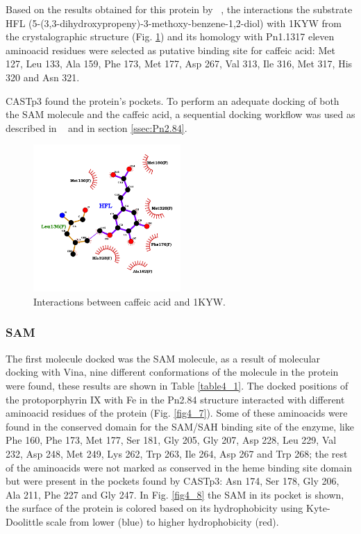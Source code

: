 \documentclass[12pt]{article}
\newcommand{\textcite}[1]{\citeauthor{#1}~\citeyear{#1}}
\begin{document}
	Based on the results obtained for this protein by \textcite{caff}, the interactions the substrate HFL (5-(3,3-dihydroxypropeny)-3-methoxy-benzene-1,2-diol) with 1KYW from the crystalographic structure (Fig. \ref{fig4_6}) and its homology with Pn1.1317 eleven aminoacid residues were selected as putative binding site for caffeic acid: Met 127, Leu 133, Ala 159, Phe 173, Met 177, Asp 267, Val 313, Ile 316, Met 317, His 320 and Asn 321.
	
	CASTp3 found the protein's pockets. \cite{castp} To perform an adequate docking of both the SAM molecule and the caffeic acid, a sequential docking workflow was used as described in \textcite{sequential} and in section \ref{ssec:Pn2.84}.
	
	\newpage
	
	\FloatBarrier
	\begin{figure}
		\centering
		\includegraphics[width=0.5\textwidth]{../4/Phylogeny/hfl.png}
		\caption{Interactions between caffeic acid and 1KYW.}
		\label{fig4_6}
	\end{figure}
	\FloatBarrier
	
	\subsubsection{SAM}
	
	The first molecule docked was the SAM molecule, as a result of molecular docking with Vina, nine different conformations of the molecule in the protein were found, these results are shown in Table \ref{table4_1}. The docked positions of the protoporphyrin IX with Fe in the Pn2.84 structure interacted with different aminoacid residues of the protein (Fig. \ref{fig4_7}). Some of these aminoacids were found in the conserved domain for the SAM/SAH binding site of the enzyme, like Phe 160, Phe 173, Met 177, Ser 181, Gly 205, Gly 207, Asp 228, Leu 229, Val 232, Asp 248, Met 249, Lys 262, Trp 263, Ile 264, Asp 267 and Trp 268; the rest of the aminoacids were not marked as conserved in the heme binding site domain but were present in the pockets found by CASTp3: Asn 174, Ser 178, Gly 206, Ala 211, Phe 227 and Gly 247. In Fig. \ref{fig4_8} the SAM in its pocket is shown, the surface of the protein is colored based on its hydrophobicity using Kyte-Doolittle scale from lower (blue) to higher hydrophobicity (red).
	
\end{document}

